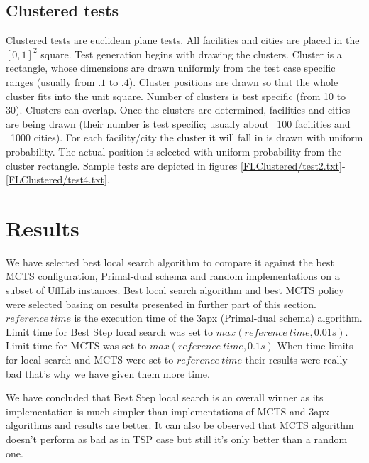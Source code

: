 \subsection{Clustered tests}
\FloatBarrier
Clustered tests are euclidean plane tests.
All facilities and cities are placed in the $[0,1]^2$ square.
Test generation begins with drawing the clusters.
Cluster is a rectangle, whose dimensions are drawn uniformly from the test case specific ranges (usually from $.1$ to $.4$).
Cluster positions are drawn so that the whole cluster fits into the unit square.
Number of clusters is test specific (from 10 to 30). Clusters can overlap.
Once the clusters are determined, facilities and cities are being drawn (their number is test specific; usually about ~100 facilities and ~1000 cities).
For each facility/city the cluster it will fall in is drawn with uniform probability.
The actual position is selected with uniform probability from the cluster rectangle.
Sample tests are depicted in figures \ref{FLClustered/test2.txt}-\ref{FLClustered/test4.txt}.




\FloatBarrier

\section{Results}

We have selected best local search algorithm to compare it against the best MCTS configuration,
Primal-dual schema and random implementations on a subset of UflLib instances.
Best local search algorithm and best MCTS policy were selected basing on
results presented in further part of this section. \\
$reference \ time$ is the execution time of the 3apx (Primal-dual schema) algorithm. \\
Limit time for Best Step local search was set to $max(reference \ time, 0.01s)$. \\
Limit time for MCTS was set to $max(reference \ time, 0.1s)$
When time limits for local search and MCTS were set to $reference \ time$ their
results were really bad that's why we have given them more time. \\


\FloatBarrier

We have concluded that Best Step local search is an overall winner as
its implementation is much simpler than implementations of
MCTS and 3apx algorithms and results are better.
It can also be observed that MCTS algorithm doesn't perform as bad as in TSP case
but still it's only better than a random one.


